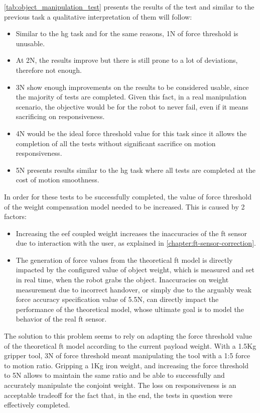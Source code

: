 \par \autoref{tab:object_manipulation_test} presents the results of the test and similar to the previous task a qualitative interpretation of them will follow: 
\begin{itemize}
    \item Similar to the \ac{hg} task and for the same reasons, 1N of force threshold is unusable.
    \item At 2N, the results improve but there is still prone to a lot of deviations, therefore not enough.
    \item 3N show enough improvements on the results to be considered usable, since the majority of tests are completed. Given this fact, in a real manipulation scenario, the objective would be for the robot to never fail, even if it means sacrificing on responsiveness.
    \item 4N would be the ideal force threshold value for this task since it allows the completion of all the tests without significant sacrifice on motion responsiveness.
    \item 5N presents results similar to the \ac{hg} task where all tests are completed at the cost of motion smoothness.
\end{itemize}

\par In order for these tests to be successfully completed, the value of force threshold of the weight compensation model needed to be increased. This is caused by 2 factors: 

\begin{itemize}
    \item Increasing the \ac{eef} coupled weight increases the inaccuracies of the \ac{ft} sensor due to interaction with the user, as explained in \autoref{chapter:ft-sensor-correction}.
    \item The generation of force values from the theoretical \ac{ft} model is directly impacted by the configured value of object weight, which is measured and set in real time, when the robot grabs the object. Inaccuracies on weight measurement due to incorrect handover, or simply due to the arguably weak force accuracy specification value of 5.5N, can directly impact the performance of the theoretical model, whose ultimate goal is to model the behavior of the real \ac{ft} sensor.
\end{itemize}

\par The solution to this problem seems to rely on adapting the force threshold value of the theoretical \ac{ft} model according to the current payload weight. With a 1.5Kg gripper tool, 3N of force threshold meant manipulating the tool with a 1:5 force to motion ratio. Gripping a 1Kg iron weight, and increasing the force threshold to 5N allows to maintain the same ratio and be able to successfully and accurately manipulate the conjoint weight. The loss on responsiveness is an acceptable tradeoff for the fact that, in the end, the tests in question were effectively completed. 

